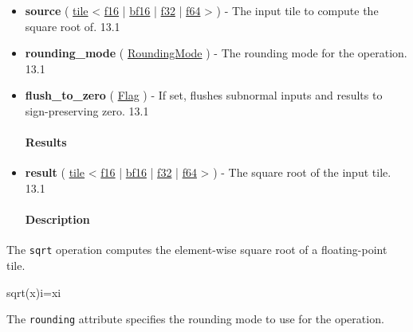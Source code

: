 \documentclass{article}
\begin{document}
\begin{itemize}
\item \textbf{source} ( \href{https://docs.nvidia.com/cuda/tile-ir/latest/sections/types.html#type-tile}{tile} < \href{https://docs.nvidia.com/cuda/tile-ir/latest/sections/types.html#subsection-element-types}{f16} | \href{https://docs.nvidia.com/cuda/tile-ir/latest/sections/types.html#subsection-element-types}{bf16} | \href{https://docs.nvidia.com/cuda/tile-ir/latest/sections/types.html#subsection-element-types}{f32} | \href{https://docs.nvidia.com/cuda/tile-ir/latest/sections/types.html#subsection-element-types}{f64} > ) - The input tile to compute the square root of. 13.1
\item \textbf{rounding\_mode} ( \href{https://docs.nvidia.com/cuda/tile-ir/latest/sections/operations.html#op-attribute-cuda-tile-sqrt-roundingmode-attr}{RoundingMode} ) - The rounding mode for the operation. 13.1
\item \textbf{flush\_to\_zero} ( \href{https://docs.nvidia.com/cuda/tile-ir/latest/sections/operations.html#type-flag}{Flag} ) - If set, flushes subnormal inputs and results to sign-preserving zero. 13.1


\paragraph{Results}

\item \textbf{result} ( \href{https://docs.nvidia.com/cuda/tile-ir/latest/sections/types.html#type-tile}{tile} < \href{https://docs.nvidia.com/cuda/tile-ir/latest/sections/types.html#subsection-element-types}{f16} | \href{https://docs.nvidia.com/cuda/tile-ir/latest/sections/types.html#subsection-element-types}{bf16} | \href{https://docs.nvidia.com/cuda/tile-ir/latest/sections/types.html#subsection-element-types}{f32} | \href{https://docs.nvidia.com/cuda/tile-ir/latest/sections/types.html#subsection-element-types}{f64} > ) - The square root of the input tile. 13.1


\paragraph{Description}

\end{itemize}
The \texttt{sqrt} operation computes the element-wise square root of a floating-point tile.


sqrt(x)i=xi

The \texttt{rounding} attribute specifies the rounding mode to use for the operation.
\end{document}

